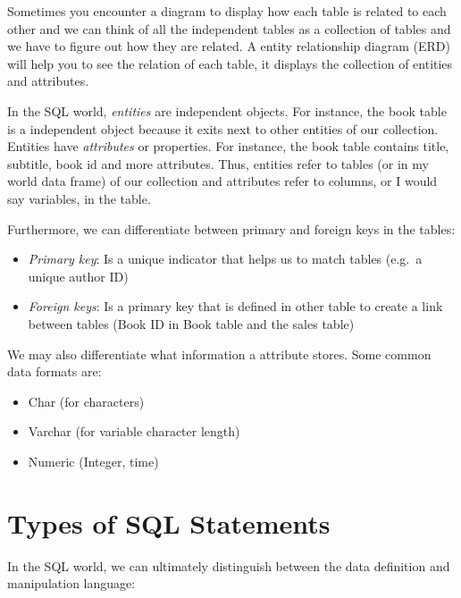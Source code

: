 \documentclass[
  letterpaper,
  DIV=11,
  numbers=noendperiod]{scrreprt}
\providecommand{\tightlist}{%
  \setlength{\itemsep}{0pt}\setlength{\parskip}{0pt}}\usepackage{longtable,booktabs,array}
\begin{document}
Sometimes you encounter a diagram to display how each table is related
to each other and we can think of all the independent tables as a
collection of tables and we have to figure out how they are related. A
entity relationship diagram (ERD) will help you to see the relation of
each table, it displays the collection of entities and attributes.

In the SQL world, \emph{entities} are independent objects. For instance,
the book table is a independent object because it exits next to other
entities of our collection. Entities have \emph{attributes} or
properties. For instance, the book table contains title, subtitle, book
id and more attributes. Thus, entities refer to tables (or in my world
data frame) of our collection and attributes refer to columns, or I
would say variables, in the table.

Furthermore, we can differentiate between primary and foreign keys in
the tables:

\begin{itemize}
\tightlist
\item
  \emph{Primary key}: Is a unique indicator that helps us to match
  tables (e.g.~a unique author ID)
\item
  \emph{Foreign keys}: Is a primary key that is defined in other table
  to create a link between tables (Book ID in Book table and the sales
  table)
\end{itemize}

We may also differentiate what information a attribute stores. Some
common data formats are:

\begin{itemize}
\tightlist
\item
  Char (for characters)
\item
  Varchar (for variable character length)
\item
  Numeric (Integer, time)
\end{itemize}

\hypertarget{types-of-sql-statements}{%
\section{Types of SQL Statements}\label{types-of-sql-statements}}

In the SQL world, we can ultimately distinguish between the data
definition and manipulation language:
\end{document}

